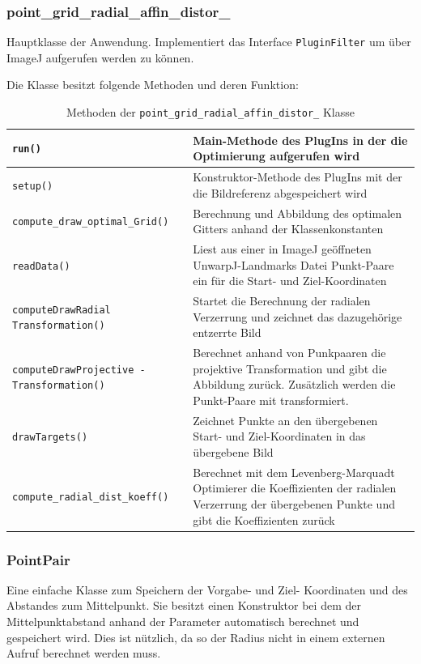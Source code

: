 \subsubsection{point\_grid\_radial\_affin\_distor\_}
Hauptklasse der Anwendung. Implementiert das Interface \texttt{PluginFilter} um über ImageJ aufgerufen werden zu können.

Die Klasse besitzt folgende Methoden und deren Funktion:

\begin{table}[H]
	\begin{tabular}{|p{} | p{}|} 
		\hline
		\texttt{run()} & Main-Methode des PlugIns in der die Optimierung aufgerufen wird\\ \hline
		\texttt{setup()} & Konstruktor-Methode des PlugIns mit der die Bildreferenz abgespeichert wird\\ \hline
		\texttt{compute\_draw\_optimal\_Grid()} & Berechnung und Abbildung des optimalen Gitters anhand der Klassenkonstanten \\ \hline
		\texttt{readData()} & Liest aus einer in ImageJ geöffneten UnwarpJ-Landmarks Datei Punkt-Paare ein für die Start- und Ziel-Koordinaten\\\hline
		\texttt{computeDrawRadial Transformation()} & Startet die Berechnung der radialen Verzerrung und zeichnet das dazugehörige entzerrte Bild\\ \hline
		\texttt{computeDrawProjective -Transformation()} & Berechnet anhand von Punkpaaren die projektive Transformation und gibt die Abbildung zurück. Zusätzlich werden die Punkt-Paare mit transformiert.\\ \hline
		\texttt{drawTargets()} & Zeichnet Punkte an den übergebenen Start- und Ziel-Koordinaten in das übergebene Bild\\ \hline
		\texttt{compute\_radial\_dist\_koeff()} & Berechnet mit dem Levenberg-Marquadt Optimierer die Koeffizienten der radialen Verzerrung der übergebenen Punkte und gibt die Koeffizienten zurück\\ 
		\hline
	\end{tabular}
	\caption{Methoden der \texttt{point\_grid\_radial\_affin\_distor\_} Klasse}
\end{table}

\subsubsection{PointPair}
Eine einfache Klasse zum Speichern der Vorgabe- und Ziel- Koordinaten und des Abstandes zum Mittelpunkt. Sie besitzt einen Konstruktor bei dem der Mittelpunktabstand anhand der Parameter automatisch berechnet und gespeichert wird. Dies ist nützlich, da so der Radius nicht in einem externen Aufruf berechnet werden muss.

